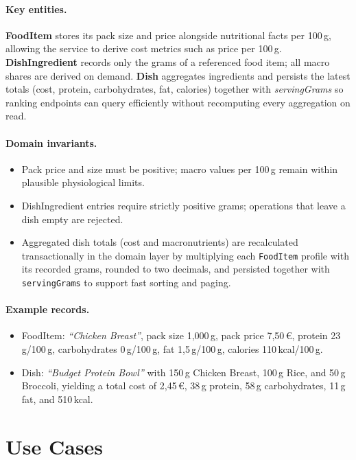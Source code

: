 \documentclass[11pt]{article}
\begin{document}
\paragraph{Key entities.} \textbf{FoodItem} stores its pack size and price alongside nutritional facts per 100\,g, allowing the service to derive cost metrics such as price per 100\,g. \textbf{DishIngredient} records only the grams of a referenced food item; all macro shares are derived on demand. \textbf{Dish} aggregates ingredients and persists the latest totals (cost, protein, carbohydrates, fat, calories) together with \textit{servingGrams} so ranking endpoints can query efficiently without recomputing every aggregation on read.

\paragraph{Domain invariants.}
\begin{itemize}[noitemsep]
  \item Pack price and size must be positive; macro values per 100\,g remain within plausible physiological limits.
  \item DishIngredient entries require strictly positive grams; operations that leave a dish empty are rejected.
  \item Aggregated dish totals (cost and macronutrients) are recalculated transactionally in the domain layer by multiplying each \texttt{FoodItem} profile with its recorded grams, rounded to two decimals, and persisted together with \texttt{servingGrams} to support fast sorting and paging.
\end{itemize}

\paragraph{Example records.}
\begin{itemize}[noitemsep]
  \item FoodItem: \emph{``Chicken Breast''}, pack size 1{,}000\,g, pack price 7{,}50\,€, protein 23\,g/100\,g, carbohydrates 0\,g/100\,g, fat 1{,}5\,g/100\,g, calories 110\,kcal/100\,g.
  \item Dish: \emph{``Budget Protein Bowl''} with 150\,g Chicken Breast, 100\,g Rice, and 50\,g Broccoli, yielding a total cost of 2{,}45\,€, 38\,g protein, 58\,g carbohydrates, 11\,g fat, and 510\,kcal.
\end{itemize}

\section{Use Cases}
\end{document}
